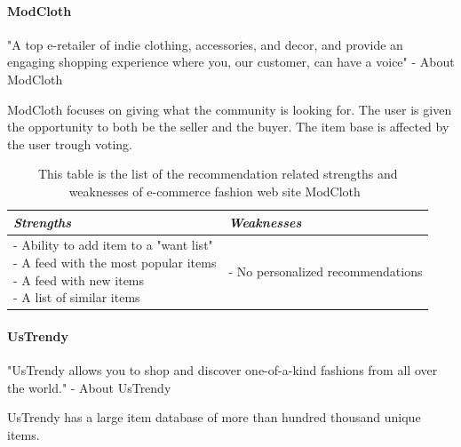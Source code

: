 \paragraph{ModCloth} %
\label{par:modcloth}
    "A top e-retailer of indie clothing, accessories, and decor, and provide an engaging shopping experience where you, our customer, can have a voice" - About ModCloth~\cite{modcloth}

    ModCloth focuses on giving what the community is looking for.
    The user is given the opportunity to both be the seller and the buyer.
    The item base is affected by the user trough voting.
    \begin{table}[H]
        \centering
        \begin{tabular}{l|l}
            \toprule
            \emph{Strengths} & \emph{Weaknesses} \\ \hline
            \pbox{9cm}{
                - Ability to add item to a "want list" \\
                - A feed with the most popular items \\
                - A feed with new items \\
                - A list of similar items
            } & \pbox{9cm}{
                - No personalized recommendations \\
            } \\ \bottomrule
        \end{tabular}
        \caption[Recommendation related strengths and weaknesses of ModCloth~\cite{ModCloth}]{This table is the list of the recommendation related strengths and weaknesses of e-commerce fashion web site ModCloth~\cite{ModCloth}}
        \label{table:ecommenreceModCloth}
    \end{table}


\paragraph{UsTrendy} %
\label{par:ustrendy}
    "UsTrendy allows you to shop and discover one-of-a-kind fashions from all over the world." - About UsTrendy~\cite{UsTrendy}

    UsTrendy has a large item database of more than hundred thousand unique items.

